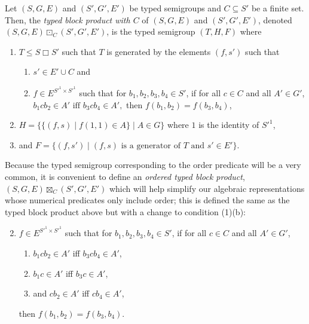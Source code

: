 \documentclass[a4paper,UKenglish,cleveref, autoref, thm-restate, anonymous]{lipics-v2021}
\begin{document}
\begin{definition}\label{def:typedblockproduct}
    Let $(S, G, E)$ and $(S', G', E')$ be typed semigroups and $C \subseteq S'$ be a finite set. Then, the \emph{typed block product with $C$} of $(S, G, E)$ and $(S', G', E')$, denoted $(S, G, E) \boxdot_C (S', G', E')$, is the typed semigroup $(T, H, F)$ where
    \begin{enumerate}[\ \ \ \ (1)]
        \item $T \leq S \Box S'$ such that $T$ is generated by the elements $(f,s')$ such that
        \begin{enumerate}[\ \ \ \ (a)]
            \item $s' \in E' \cup C$ and
            \item $f \in E^{S'^1 \times S'^1}$ such that for $b_1,b_2,b_3,b_4 \in S'$, if for all $c \in C$ and all $A' \in G'$, \(
                b_1cb_2 \in A' \text{ iff } b_3cb_4 \in A',
            \) then $f(b_1,b_2) = f(b_3,b_4)$,
        \end{enumerate}
        \item $H = \{\{(f,s) \mid f(1,1) \in A\} \mid A \in G\}$ where $1$ is the identity of $S'^1$,
        \item and $F = \{(f,s') \mid \text{$(f,s)$ is a generator of $T$ and } s' \in E'\}$.
    \end{enumerate}
\end{definition}
\begin{definition}\label{def:orderedtypedblockproduct}
    Because the typed semigroup corresponding to the order predicate will be a very common, it is convenient to define an \emph{ordered typed block product}, $(S, G, E) \boxtimes_C (S', G', E')$ which will help simplify our algebraic representations whose numerical predicates only include order; this is defined the same as the typed block product above but with a change to condition (1)(b):
    \begin{enumerate}[\ \ \ \ {(1)}(b${}_<$)]
        \setcounter{enumi}{1}
        \item $f \in E^{S'^{1} \times S'^{1}}$ such that for $b_1,b_2,b_3,b_4 \in S'$, if for all $c \in C$ and all $A' \in G'$,
        \begin{enumerate}[\ \ \ \ (i)]
            \item $b_1cb_2 \in A'$ iff $b_3cb_4 \in A'$,
            \item $b_1c \in A'$ iff $b_3c \in A'$,
            \item and $cb_2 \in A'$ iff $cb_4 \in A'$,
        \end{enumerate}
        then $f(b_1,b_2) = f(b_3,b_4)$.
    \end{enumerate}
\end{definition}
\end{document}

